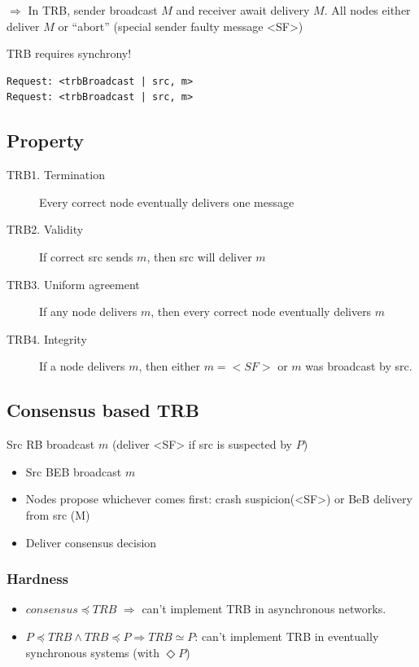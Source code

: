 $\Rightarrow$ In TRB, sender broadcast $M$ and receiver await delivery $M$. All
nodes either deliver $M$ or \enquote{abort} (special sender faulty message <SF>)

TRB requires synchrony!

\begin{lstlisting}
Request: <trbBroadcast | src, m>
Request: <trbBroadcast | src, m>
\end{lstlisting}

\subsection{Property}
\begin{description}
	\item[TRB1. Termination] Every correct node eventually delivers one message
	\item[TRB2. Validity] If correct src sends $m$, then src will deliver $m$
	\item[TRB3. Uniform agreement] If any node delivers $m$, then every correct node
	eventually delivers $m$
	\item[TRB4. Integrity] If a node delivers $m$, then either $m=<SF>$ or $m$ was
	broadcast by src.
\end{description}

\subsection{Consensus based TRB}
Src RB broadcast $m$ (deliver <SF> if src is suspected by $P$)
\begin{itemize}
	\item Src BEB broadcast $m$
	\item Nodes propose whichever comes first: crash suspicion(<SF>) or
	BeB delivery from src (M)
	\item Deliver consensus decision
\end{itemize}


\subsubsection{Hardness}
\begin{itemize}
    \item $consensus \preceq TRB$ $\Rightarrow$ can't implement TRB in asynchronous networks.
    \item $ P \preceq TRB \land TRB \preceq P \Rightarrow TRB \simeq P$: can't
    implement TRB in eventually synchronous systems (with $\Diamond P$)
\end{itemize}

